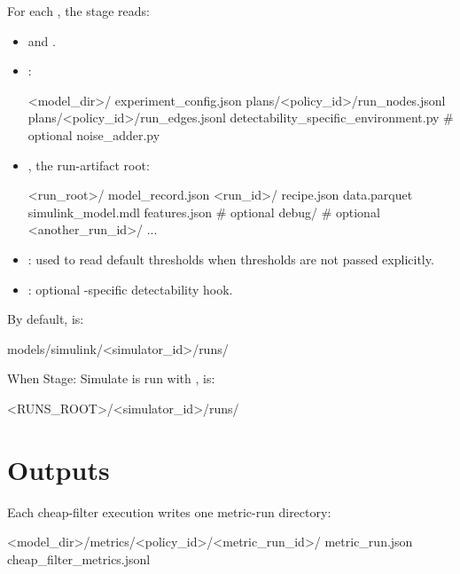 \documentclass[11pt]{article}
\begin{document}
For each \termSimulator, the stage reads:

\begin{itemize}
\item {}\hyperref[sec:candidate-generation-run-nodes]{} and \hyperref[sec:candidate-generation-run-edges]{}.
\item  {}:
\begin{DocCode}
<model_dir>/
    experiment_config.json
    plans/<policy_id>/run_nodes.jsonl
    plans/<policy_id>/run_edges.jsonl
    detectability_specific_environment.py # optional
    noise_adder.py
\end{DocCode}
\item {}, the run-artifact root:
\begin{DocCode}
<run_root>/
  model_record.json
  <run_id>/
    recipe.json
    data.parquet
    simulink_model.mdl
    features.json        # optional
    debug/               # optional
  <another_run_id>/
    ...
\end{DocCode}
\item {}: used to read default thresholds when thresholds are not passed explicitly.
\item {}: optional \termSimulator-specific detectability hook.
\end{itemize}

By default,  is:

\begin{DocCode}
models/simulink/<simulator_id>/runs/
\end{DocCode}

When Stage: Simulate is run with ,  is:

\begin{DocCode}
<RUNS_ROOT>/<simulator_id>/runs/
\end{DocCode}

\section*{Outputs}

Each cheap-filter execution writes one metric-run directory:

\begin{DocCode}
<model_dir>/metrics/<policy_id>/<metric_run_id>/
  metric_run.json
  cheap_filter_metrics.jsonl
\end{DocCode}
\end{document}
